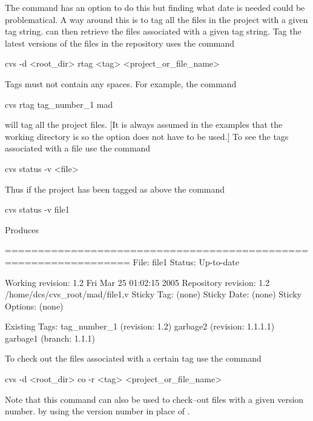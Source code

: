 The  command has an option to do this but finding what date
is needed could be problematical. A way around this is to tag all
the files in the project with a given tag string. \cvs can then
retrieve the files associated with a given tag string. Tag the
latest versions of the files in the repository uses the command
\begin{example}
  cvs -d <root_dir> rtag <tag> <project_or_file_name>
\end{example}
Tags must not contain any spaces. For example, the command
\begin{example}
  cvs rtag tag_number_1 mad
\end{example}
will tag all the  project files. [It is always assumed in the
examples that the working directory is  so the  option
does not have to be used.] To see the tags associated with a file use
the command
\begin{example}
  cvs status -v <file>
\end{example}
Thus if the  project has been tagged as above the command
\begin{example}
  cvs status -v file1
\end{example}
Produces
\begin{example}
  =================================================================
  File: file1             Status: Up-to-date
  
     Working revision:    1.2     Fri Mar 25 01:02:15 2005             
     Repository revision: 1.2     /home/dcs/cvs_root/mad/file1,v
     Sticky Tag:          (none)
     Sticky Date:         (none)
     Sticky Options:      (none)
  
     Existing Tags:
          tag_number_1                    (revision: 1.2)
          garbage2                        (revision: 1.1.1.1)
          garbage1                        (branch: 1.1.1)
\end{example}

To check out the files associated with a certain tag use the command
\begin{example}
  cvs -d <root_dir> co -r <tag> <project_or_file_name>
\end{example}
Note that this command can also be used to check--out files with a
given version number. by using the version number in place of
.


